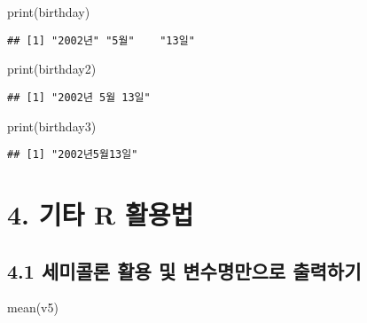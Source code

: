 \documentclass[
]{article}
\newenvironment{Shaded}{\begin{snugshade}}{\end{snugshade}}
\newcommand{\FunctionTok}[1]{\textcolor[rgb]{0.00,0.00,0.00}{#1}}
\newcommand{\NormalTok}[1]{#1}
\begin{document}
\begin{Shaded}
\begin{Highlighting}[]
\FunctionTok{print}\NormalTok{(birthday)}
\end{Highlighting}
\end{Shaded}

\begin{verbatim}
## [1] "2002년" "5월"    "13일"
\end{verbatim}

\begin{Shaded}
\begin{Highlighting}[]
\FunctionTok{print}\NormalTok{(birthday2)}
\end{Highlighting}
\end{Shaded}

\begin{verbatim}
## [1] "2002년 5월 13일"
\end{verbatim}

\begin{Shaded}
\begin{Highlighting}[]
\FunctionTok{print}\NormalTok{(birthday3)}
\end{Highlighting}
\end{Shaded}

\begin{verbatim}
## [1] "2002년5월13일"
\end{verbatim}

\hypertarget{uxae30uxd0c0-r-uxd65cuxc6a9uxbc95}{%
\section{4. 기타 R 활용법}\label{uxae30uxd0c0-r-uxd65cuxc6a9uxbc95}}

\hypertarget{uxc138uxbbf8uxcf5cuxb860-uxd65cuxc6a9-uxbc0f-uxbcc0uxc218uxba85uxb9ccuxc73cuxb85c-uxcd9cuxb825uxd558uxae30}{%
\subsection{4.1 세미콜론 활용 및 변수명만으로
출력하기}\label{uxc138uxbbf8uxcf5cuxb860-uxd65cuxc6a9-uxbc0f-uxbcc0uxc218uxba85uxb9ccuxc73cuxb85c-uxcd9cuxb825uxd558uxae30}}

\begin{Shaded}
\begin{Highlighting}[]
\FunctionTok{mean}\NormalTok{(v5)}
\end{Highlighting}
\end{Shaded}
\end{document}
